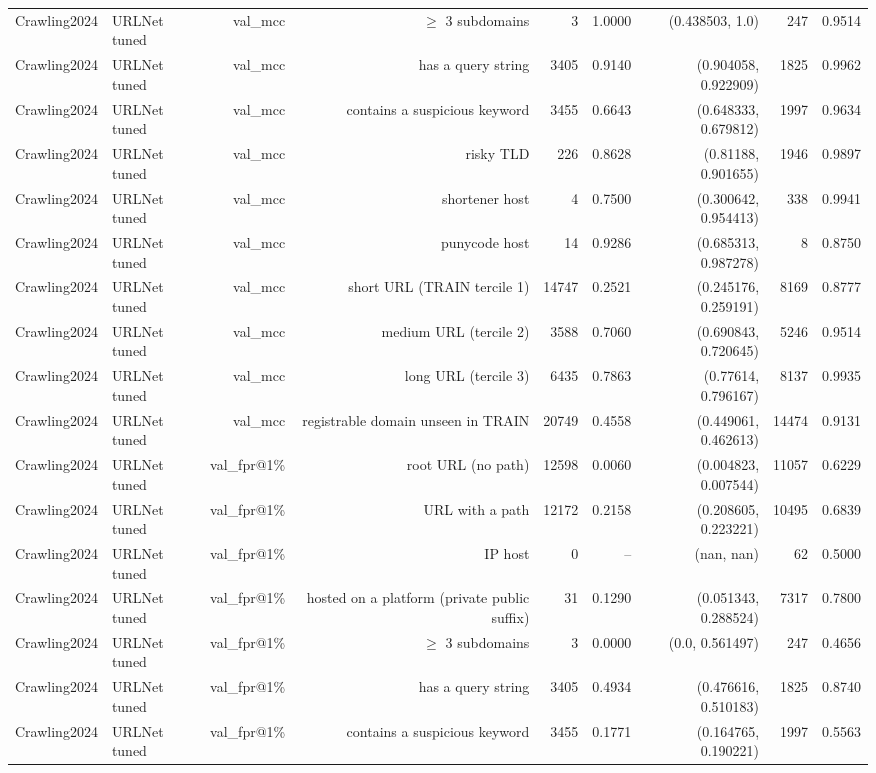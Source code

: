 \begin{table}[t]
\begin{tabular}{llrrrrrrr}
Crawling2024 & URLNet tuned & val\_mcc & $\geq$ 3 subdomains & 3 & 1.0000 & (0.438503, 1.0) & 247 & 0.9514 \\
Crawling2024 & URLNet tuned & val\_mcc & has a query string & 3405 & 0.9140 & (0.904058, 0.922909) & 1825 & 0.9962 \\
Crawling2024 & URLNet tuned & val\_mcc & contains a suspicious keyword & 3455 & 0.6643 & (0.648333, 0.679812) & 1997 & 0.9634 \\
Crawling2024 & URLNet tuned & val\_mcc & risky TLD & 226 & 0.8628 & (0.81188, 0.901655) & 1946 & 0.9897 \\
Crawling2024 & URLNet tuned & val\_mcc & shortener host & 4 & 0.7500 & (0.300642, 0.954413) & 338 & 0.9941 \\
Crawling2024 & URLNet tuned & val\_mcc & punycode host & 14 & 0.9286 & (0.685313, 0.987278) & 8 & 0.8750 \\
Crawling2024 & URLNet tuned & val\_mcc & short URL (TRAIN tercile 1) & 14747 & 0.2521 & (0.245176, 0.259191) & 8169 & 0.8777 \\
Crawling2024 & URLNet tuned & val\_mcc & medium URL (tercile 2) & 3588 & 0.7060 & (0.690843, 0.720645) & 5246 & 0.9514 \\
Crawling2024 & URLNet tuned & val\_mcc & long URL (tercile 3) & 6435 & 0.7863 & (0.77614, 0.796167) & 8137 & 0.9935 \\
Crawling2024 & URLNet tuned & val\_mcc & registrable domain unseen in TRAIN & 20749 & 0.4558 & (0.449061, 0.462613) & 14474 & 0.9131 \\
Crawling2024 & URLNet tuned & val\_fpr@1\% & root URL (no path) & 12598 & 0.0060 & (0.004823, 0.007544) & 11057 & 0.6229 \\
Crawling2024 & URLNet tuned & val\_fpr@1\% & URL with a path & 12172 & 0.2158 & (0.208605, 0.223221) & 10495 & 0.6839 \\
Crawling2024 & URLNet tuned & val\_fpr@1\% & IP host & 0 & -- & (nan, nan) & 62 & 0.5000 \\
Crawling2024 & URLNet tuned & val\_fpr@1\% & hosted on a platform (private public suffix) & 31 & 0.1290 & (0.051343, 0.288524) & 7317 & 0.7800 \\
Crawling2024 & URLNet tuned & val\_fpr@1\% & $\geq$ 3 subdomains & 3 & 0.0000 & (0.0, 0.561497) & 247 & 0.4656 \\
Crawling2024 & URLNet tuned & val\_fpr@1\% & has a query string & 3405 & 0.4934 & (0.476616, 0.510183) & 1825 & 0.8740 \\
Crawling2024 & URLNet tuned & val\_fpr@1\% & contains a suspicious keyword & 3455 & 0.1771 & (0.164765, 0.190221) & 1997 & 0.5563 \\

\end{tabular}
\end{table}
